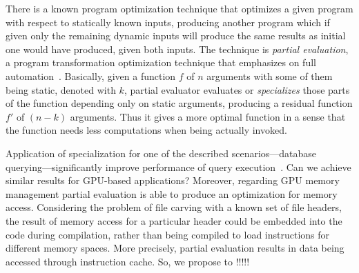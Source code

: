 \documentclass[sigplan,review,anonymous]{acmart}\settopmatter{printfolios=true,printccs=false,printacmref=false}
\newcommand\question[1]{{\color{violet}#1}}
\begin{document}
There is a known program optimization technique that optimizes a given program with respect to statically known inputs, producing another program which if given only the remaining dynamic inputs will produce the same results as initial one would have produced, given both inputs.
\question{The technique is \textit{partial evaluation}, a program transformation optimization technique that emphasizes on full automation~\cite{Jones:1993:PEA:153676}.
Basically, given a function $f$ of $n$ arguments with some of them being static, denoted with $k$, partial evaluator evaluates or \textit{specializes} those parts of the function depending only on static arguments, producing a residual function $f'$ of $(n-k)$ arguments.
Thus it gives a more optimal function in a sense that the function needs less computations when being actually invoked.}

Application of specialization for one of the described scenarios---database querying---significantly improve performance of query execution~\cite{10.1007/978-3-319-74313-4_27}.
Can we achieve similar results for GPU-based applications?
Moreover, regarding GPU memory management partial evaluation is able to produce an optimization for memory access. 
Considering the problem of file carving with a known set of file headers, the result of memory access for a particular header could be embedded into the code during compilation, rather than being compiled to load instructions for different memory spaces. 
More precisely, partial evaluation results in data being accessed through instruction cache. 
So, we propose to !!!!!

\end{document}
